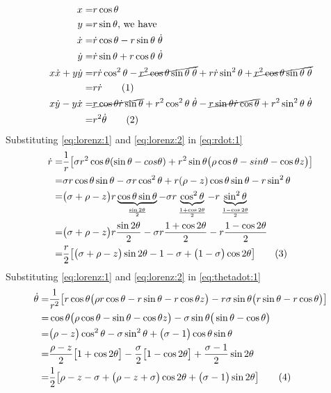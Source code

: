 \documentclass[]{article}
\newcommand\numberthis{\addtocounter{equation}{1}\tag{\theequation}}
\begin{document}
\begin{align*}
	x =& r \cos \theta\\
	y =& r \sin \theta \text{, we have}\\
	\dot{x} =& \dot{r} \cos \theta - r \sin\theta \; \dot{\theta}\\
	\dot{y} =& \dot{r} \sin \theta + r \cos\theta \; \dot{\theta}\\
	x\dot{x}+ y\dot{y} =& r  \dot{r} \cos^2 \theta -  \cancel{r^2 \cos \theta \sin\theta \; \dot{\theta}}+  r \dot{r} \sin^2 \theta + \cancel{ r^2 \cos\theta \sin \theta \; \dot{\theta}}\\
	=& r \dot{r} \numberthis \label{eq:rdot:1}\\
	x\dot{y}-y\dot{x}=& \cancel{r \cos \theta \dot{r} \sin \theta} +r^2 \cos^2 \theta  \; \dot{\theta} -\cancel{r \sin \theta \dot{r} \cos \theta} + r^2 \sin^2 \theta  \; \dot{\theta}\\
	=& r^2 \dot{\theta} \numberthis \label{eq:thetadot:1}
\end{align*}
Substituting  \eqref{eq:lorenz:1} and \eqref{eq:lorenz:2} in \eqref{eq:rdot:1}
\begin{align*}
	\dot r =& \frac{1}{r}\big[\sigma r^2 \cos \theta (\sin\theta-cos\theta) +  r^2 \sin \theta \big(\rho \cos\theta -sin\theta - \cos \theta z\big)\big]\\
	=& \sigma r \cos \theta \sin\theta -\sigma r \cos^2 \theta + r (\rho-z) \cos\theta \sin \theta-r \sin^2 \theta \\
	=& \big(\sigma +\rho -z \big)r \underbrace{\cos \theta \sin\theta}_\text{$\frac{\sin 2\theta}{2}$} -\sigma r \underbrace{\cos^2 \theta}_\text{$\frac{1+\cos 2\theta}{2}$}-r \underbrace{\sin^2 \theta}_\text{$\frac{1-\cos 2\theta}{2}$}\\
	=&  \big(\sigma +\rho -z \big)r \frac{\sin 2\theta}{2} - \sigma r \frac{1+\cos 2\theta}{2} -r \frac{1-\cos 2\theta}{2}\\
	=& \frac{r}{2}\big[\big(\sigma +\rho -z \big)\sin 2\theta - 1 -\sigma + \big(1-\sigma\big) \cos 2\theta\big] \numberthis \label{eq:lorenz:polar:r}
\end{align*}
Substituting  \eqref{eq:lorenz:1} and \eqref{eq:lorenz:2} in \eqref{eq:thetadot:1}
\begin{align*}
	\dot{\theta} =& \frac{1}{r^2}\big[ r \cos \theta\big(\rho r \cos \theta -r \sin \theta - r \cos \theta z\big) - r \sigma \sin\theta \big(r \sin \theta-r \cos \theta\big) \big]\\
	=& \cos \theta\big(\rho  \cos \theta - \sin \theta - \cos \theta z\big) -  \sigma \sin\theta \big( \sin \theta- \cos \theta\big)\\
	=& \big(\rho-z  \big) \cos^2 \theta - \sigma \sin^2 \theta + \big( \sigma-1 \big) \cos \theta \sin \theta\\
	=& \frac{\rho-z }{2}\big[1 + \cos 2 \theta\big] - \frac{\sigma}{2}\big[1 - \cos 2 \theta\big]+\frac{\sigma-1}{2} \sin 2 \theta\\
	=& \frac{1}{2}\big[\rho-z -\sigma + \big(\rho-z +\sigma\big)\cos 2 \theta + \big(\sigma-1\big) \sin 2 \theta\big] \numberthis \label{eq:lorenz:polar:theta}
\end{align*}
\end{document}
